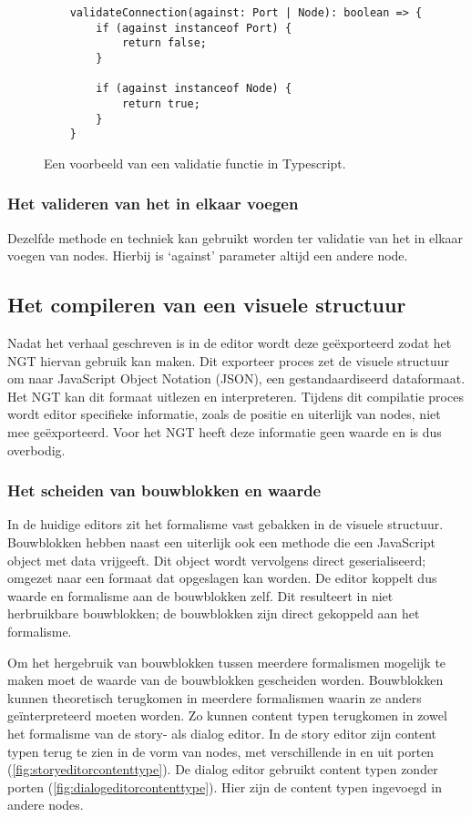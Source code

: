 \begin{figure}[htb]
    \centering
    \lstset{language=JavaScript}
    \begin{lstlisting}
    validateConnection(against: Port | Node): boolean => {
        if (against instanceof Port) {
            return false;
        }

        if (against instanceof Node) {
            return true;
        }
    }
    \end{lstlisting}
    \caption{Een voorbeeld van een validatie functie in Typescript.}
    \label{fig:validationfunction}
\end{figure}

\subsubsection{Het valideren van het in elkaar voegen}
Dezelfde methode en techniek kan gebruikt worden ter validatie van het in elkaar voegen van nodes. Hierbij is ‘against’ parameter altijd een andere node.

\subsection{Het compileren van een visuele structuur}
Nadat het verhaal geschreven is in de editor wordt deze geëxporteerd zodat het NGT hiervan gebruik kan maken. Dit exporteer proces zet de visuele structuur om naar JavaScript Object Notation (JSON), een gestandaardiseerd dataformaat. Het NGT kan dit formaat uitlezen en interpreteren. Tijdens dit compilatie proces wordt editor specifieke informatie, zoals de positie en uiterlijk van nodes, niet mee geëxporteerd. Voor het NGT heeft deze informatie geen waarde en is dus overbodig.

\subsubsection{Het scheiden van bouwblokken en waarde}
In de huidige editors zit het formalisme vast gebakken in de visuele structuur. Bouwblokken hebben naast een uiterlijk ook een methode die een JavaScript object met data vrijgeeft. Dit object wordt vervolgens direct geserialiseerd; omgezet naar een formaat dat opgeslagen kan worden. De editor koppelt dus waarde en formalisme aan de bouwblokken zelf. Dit resulteert in niet herbruikbare bouwblokken; de bouwblokken zijn direct gekoppeld aan het formalisme.

Om het hergebruik van bouwblokken tussen meerdere formalismen mogelijk te maken moet de waarde van de bouwblokken gescheiden worden. Bouwblokken kunnen theoretisch terugkomen in meerdere formalismen waarin ze anders geïnterpreteerd moeten worden. Zo kunnen content typen terugkomen in zowel het formalisme van de story- als dialog editor. In de story editor zijn content typen terug te zien in de vorm van nodes, met verschillende in en uit porten (\autoref{fig:storyeditorcontenttype}). De dialog editor gebruikt content typen zonder porten (\autoref{fig:dialogeditorcontenttype}). Hier zijn de content typen ingevoegd in andere nodes.

